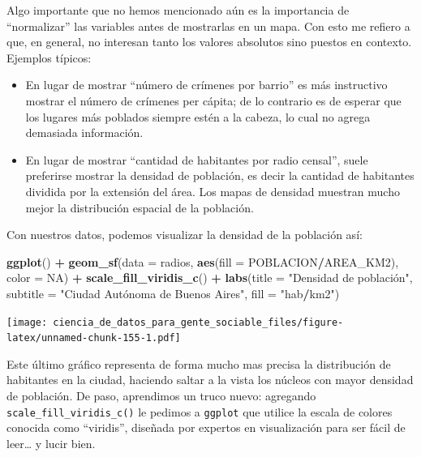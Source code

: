 \documentclass[]{book}
\newenvironment{Shaded}{\begin{snugshade}}{\end{snugshade}}
\newcommand{\KeywordTok}[1]{\textcolor[rgb]{0.13,0.29,0.53}{\textbf{#1}}}
\newcommand{\DataTypeTok}[1]{\textcolor[rgb]{0.13,0.29,0.53}{#1}}
\newcommand{\StringTok}[1]{\textcolor[rgb]{0.31,0.60,0.02}{#1}}
\newcommand{\OtherTok}[1]{\textcolor[rgb]{0.56,0.35,0.01}{#1}}
\newcommand{\OperatorTok}[1]{\textcolor[rgb]{0.81,0.36,0.00}{\textbf{#1}}}
\newcommand{\NormalTok}[1]{#1}
\providecommand{\tightlist}{%
  \setlength{\itemsep}{0pt}\setlength{\parskip}{0pt}}
\begin{document}
Algo importante que no hemos mencionado aún es la importancia de
``normalizar'' las variables antes de mostrarlas en un mapa. Con esto me
refiero a que, en general, no interesan tanto los valores absolutos sino
puestos en contexto. Ejemplos típicos:

\begin{itemize}
\tightlist
\item
  En lugar de mostrar ``número de crímenes por barrio'' es más
  instructivo mostrar el número de crímenes per cápita; de lo contrario
  es de esperar que los lugares más poblados siempre estén a la cabeza,
  lo cual no agrega demasiada información.\\
\item
  En lugar de mostrar ``cantidad de habitantes por radio censal'', suele
  preferirse mostrar la densidad de población, es decir la cantidad de
  habitantes dividida por la extensión del área. Los mapas de densidad
  muestran mucho mejor la distribución espacial de la población.
\end{itemize}

Con nuestros datos, podemos visualizar la densidad de la población así:

\begin{Shaded}
\begin{Highlighting}[]
\KeywordTok{ggplot}\NormalTok{() }\OperatorTok{+}\StringTok{ }
\StringTok{    }\KeywordTok{geom_sf}\NormalTok{(}\DataTypeTok{data =}\NormalTok{ radios, }\KeywordTok{aes}\NormalTok{(}\DataTypeTok{fill =}\NormalTok{ POBLACION}\OperatorTok{/}\NormalTok{AREA_KM2), }\DataTypeTok{color =} \OtherTok{NA}\NormalTok{) }\OperatorTok{+}
\StringTok{    }\KeywordTok{scale_fill_viridis_c}\NormalTok{() }\OperatorTok{+}
\StringTok{    }\KeywordTok{labs}\NormalTok{(}\DataTypeTok{title =} \StringTok{"Densidad de población",}
\StringTok{         subtitle = "}\NormalTok{Ciudad Autónoma de Buenos Aires}\StringTok{",}
\StringTok{         fill = "}\NormalTok{hab}\OperatorTok{/}\NormalTok{km2}\StringTok{")}
\end{Highlighting}
\end{Shaded}

\texttt{[image: ciencia\_de\_datos\_para\_gente\_sociable\_files/figure-latex/unnamed-chunk-155-1.pdf]}

Este último gráfico representa de forma mucho mas precisa la
distribución de habitantes en la ciudad, haciendo saltar a la vista los
núcleos con mayor densidad de población. De paso, aprendimos un truco
nuevo: agregando \texttt{scale\_fill\_viridis\_c()} le pedimos a
\texttt{ggplot} que utilice la escala de colores conocida como
``viridis'', diseñada por expertos en visualización para ser fácil de
leer\ldots{} y lucir bien.
\end{document}
